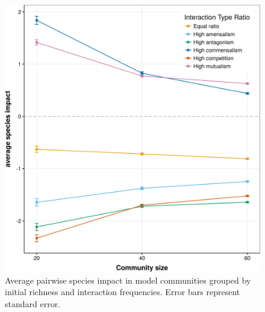 \begin{figure}[!ht]
\centering
\includegraphics[width=.7\textwidth]{./Figures/Appendix3_2/Fig_2.png}
\caption[Impact by interaction frequency]{\color{Gray} Average pairwise species impact in model communities grouped by initial richness and interaction frequencies. Error bars represent standard error.}
\label{fig:figApp3.2.2}
\end{figure}
